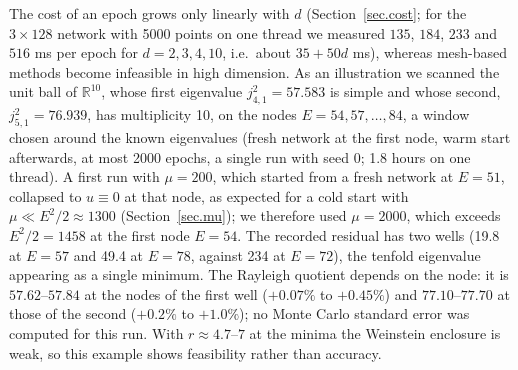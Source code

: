 \documentclass[10pt]{amsart}
\newenvironment{revblock}{\color{blue}}{}
\theoremstyle{definition}
\theoremstyle{remark}
\theoremstyle{plain}
\newcommand{\R}{\mathbb{R}}
\begin{document}
\begin{revblock}
The cost of an epoch grows only linearly with $d$ (Section~\ref{sec.cost}; for the $3\times128$ network
with 5000 points on one thread we measured $135$, $184$, $233$ and $516$ ms per epoch for $d=2,3,4,10$,
i.e.\ about $35+50d$ ms), whereas mesh-based methods
become infeasible in high dimension. As an illustration we scanned the unit ball of $\R^{10}$, whose
first eigenvalue $j_{4,1}^2=57.583$ is simple and whose second, $j_{5,1}^2=76.939$, has multiplicity
10, on the nodes $E=54,57,\dots,84$, a window chosen around the known eigenvalues (fresh network at the first node, warm start afterwards, at most
2000 epochs, a single run with seed 0; 1.8 hours on one thread).
A first run with $\mu=200$, which started from a fresh network at $E=51$, collapsed to $u\equiv0$ at
that node, as expected for a cold start with $\mu\ll E^2/2\approx1300$ (Section~\ref{sec.mu}); we
therefore used $\mu=2000$, which exceeds $E^2/2=1458$ at the first node $E=54$. The recorded residual has two
wells (19.8 at $E=57$ and 49.4 at $E=78$, against 234 at $E=72$), the tenfold eigenvalue appearing as a
single minimum. The Rayleigh quotient depends on the node: it is $57.62$--$57.84$ at the nodes of the
first well ($+0.07\%$ to $+0.45\%$) and $77.10$--$77.70$ at those of the second ($+0.2\%$ to $+1.0\%$); no
Monte Carlo standard error was computed for this run. With $r\approx4.7$--$7$ at the minima the
Weinstein enclosure is weak, so this example shows feasibility rather than accuracy.
\end{revblock}
\end{document}
